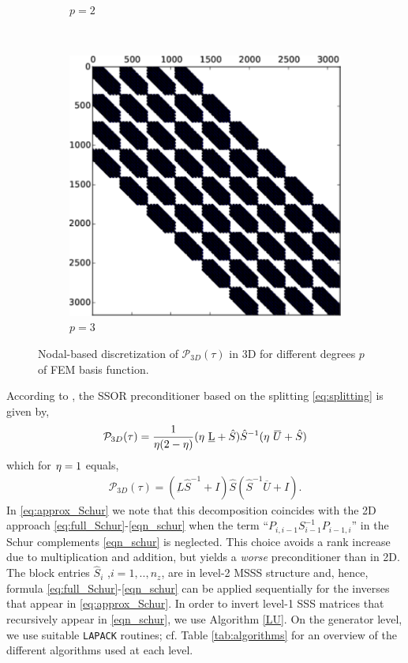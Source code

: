 {\begin{figure}[ht]
\begin{subfigure}{0.31\columnwidth}
         \caption{$p=2$}
     \end{subfigure}
     ~ 
     \begin{subfigure}{0.31\columnwidth}
         \centering
 	\includegraphics[width=\textwidth]{P3d_p3-crop_small.pdf}%
         \caption{$p=3$}
     \end{subfigure}
     \caption{Nodal-based discretization of $\mathcal{P}_{3D}(\tau)$ in 3D for different degrees $p$ of FEM basis function.} \label{fig:precon3d}
 \end{figure}
According to \cite[Section 4.1.2]{S03}, the SSOR preconditioner based on the splitting \eqref{eq:splitting} is given by,
\begin{align*}
\mathcal{P}_{3D}(\tau) = \frac{1}{\ssorfac(2-\ssorfac)}(\ssorfac\ \underbar{L}+\hat{S}) \hat{S}^{-1} (\ssorfac\ \overbar{U}+\hat{S})
\end{align*}
which for ${\eta}=1$ equals,
\begin{align}
\label{eq:approx_Schur}
\mathcal{P}_{3D}(\tau) = (\underbar{L}\hat{S}^{-1} + I) \hat{S} (\hat{S}^{-1}\overbar{U} + I).
\end{align}
In \eqref{eq:approx_Schur} we note that this decomposition coincides with the 2D approach \eqref{eq:full_Schur}-\eqref{eqn_schur} when the term ``$P_{i,i-1}S_{i-1}^{-1}P_{i-1,i}$'' in the Schur complements \eqref{eqn_schur} is neglected. This choice avoids a rank increase due to multiplication and addition, but yields a \textit{worse} preconditioner than in 2D. The block entries $\hat{S}_i$ ,$i=1,..,n_z$, are in level-2 MSSS structure and, hence, formula \eqref{eq:full_Schur}-\eqref{eqn_schur} can be applied sequentially for the inverses that appear in \eqref{eq:approx_Schur}. In order to invert level-1 SSS matrices that recursively appear in \eqref{eqn_schur}, we use Algorithm \ref{LU}. On the generator level, we use suitable \texttt{LAPACK} routines; cf. Table \ref{tab:algorithms} for an overview of the different algorithms used at each level.
}

